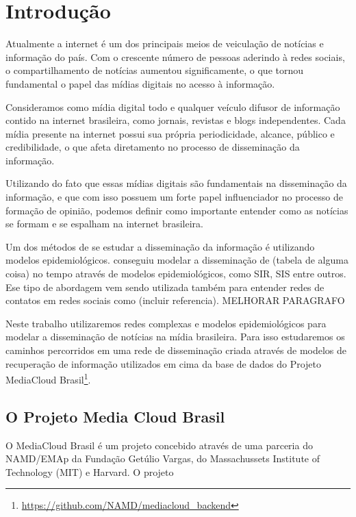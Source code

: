 \documentclass[a4paper,12pt]{article}
\begin{document}
\pagebreak

\section{Introdução}

Atualmente a internet é um dos principais meios de veiculação de notícias e informação do país. Com o crescente
número de pessoas aderindo à redes sociais, o compartilhamento de notícias aumentou significamente, o que tornou fundamental
o papel das mídias digitais no acesso à informação.

Consideramos como mídia digital todo e qualquer veículo difusor de informação contido na internet brasileira, como jornais, revistas e 
blogs independentes. Cada mídia presente na internet possui sua própria periodicidade, alcance, público e credibilidade, o que afeta
diretamento no processo de disseminação da informação.

Utilizando do fato que essas mídias digitais são fundamentais na disseminação da informação, e que com isso possuem um forte papel 
influenciador no processo de formação de opinião, podemos definir como importante entender como as notícias se formam e se espalham
na internet brasileira.

Um dos métodos de se estudar a disseminação da informação é utilizando modelos epidemiológicos. \cite{bettencourt2006power} conseguiu modelar a disseminação de (tabela de alguma coisa) no tempo através de modelos epidemiológicos, como SIR, SIS entre outros. Ese tipo
de abordagem vem sendo utilizada também para entender redes de contatos em redes sociais como (incluir referencia). MELHORAR PARAGRAFO

Neste trabalho utilizaremos redes complexas e modelos epidemiológicos para modelar a disseminação de notícias na mídia brasileira. 
Para isso
estudaremos os caminhos percorridos em uma rede de disseminação criada através de modelos de recuperação de informação utilizados em cima
da base de dados do Projeto MediaCloud Brasil\footnote[1]{\url{https://github.com/NAMD/mediacloud_backend}}.


\subsection{O Projeto Media Cloud Brasil}

 O MediaCloud Brasil é um projeto concebido através de uma parceria do NAMD/EMAp da Fundação Getúlio Vargas, do Massachussets Institute of
 Technology (MIT)  e Harvard. O projeto
\end{document}

